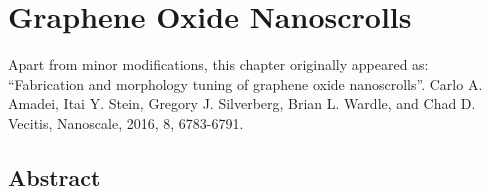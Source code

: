 \chapter{Graphene Oxide Nanoscrolls}
\thispagestyle{plain}
\vspace{-.5cm}

\noindent Apart from minor modifications, this chapter originally appeared as:\newline\\
\ssp ``Fabrication and morphology tuning of graphene oxide nanoscrolls''.
Carlo A. Amadei, Itai Y. Stein, Gregory J. Silverberg, Brian L. Wardle, and Chad D. Vecitis,  Nanoscale, 2016, 8, 6783-6791.


\section*{Abstract}
    \dsp
    


